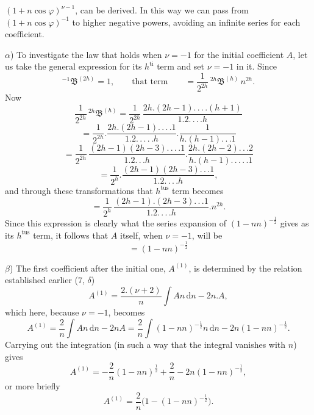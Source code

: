 $(1+n\cos\varphi)^{\nu-1}$, can be derived. In this way we can pass from $(1+n\cos\varphi)^{-1}$ to higher negative powers, avoiding an infinite series for each coefficient.

$\alpha$) To investigate the law that holds when $\nu=-1$ for the initial coefficient $A$, let us take the general expression for its $h^{\text{ti}}$ term and set $\nu=-1$ in it. Since
\[
{}^{-1}\mathfrak{B}^{(2h)} = 1, \qquad \text{that term} \qquad = \frac{1}{2^{2h}}\,{}^{2h}\mathfrak{B}^{(h)}\,n^{2h}.
\]
Now
\[
\frac{1}{2^{2h}}\,{}^{2h}\mathfrak{B}^{(h)} = \frac{1}{2^{2h}}\,\frac{2h.(2h-1).\,.\,.\,.(h+1)}{1.2.\,.\,.\,. h}
\]
\[
= \frac{1}{2^{2h}} . \frac{2h.(2h-1).\,.\,.\,. 1}{1.2.\,.\,.\,.\,. h} . \frac{1}{h.(h-1).\,.\,. 1}
\]
\[
= \frac{1}{2^{2h}}\,\frac{(2h-1)(2h-3).\,.\,.\,. 1}{1.2.\,.\,. h} . \frac{2h.(2h-2).\,.\,. 2}{h.(h-1).\,.\,.\,.\,. 1}
\]
\[
= \frac{1}{2^{h}} . \frac{(2h-1)(2h-3).\,.\,. 1}{1.2.\,.\,.\,. h},
\]
and through these transformations that $h^{\text{tus}}$ term becomes
\[
= \frac{1}{2^{h}}\,\frac{(2h-1).(2h-3).\,.\,. 1}{1.2.\,.\,.\,. h} .  n^{2h}.
\]
Since this expression is clearly what the series expansion of $(1-nn)^{-\frac{1}{2}}$ gives as its $h^{\text{tus}}$ term, it follows that $A$ itself, when $\nu=-1$, will be
\[
= (1-nn)^{-\frac{1}{2}}
\]
\par\noindent\hspace*{\parindent}$\beta$) The first coefficient after the initial one, $A^{(1)}$, is determined by the relation established earlier (7, $\delta$)
\[
A^{(1)} = \frac{2.(\nu+2)}{n}\int An\,\mathrm{d}n - 2n.A,
\]
which here, because $\nu=-1$, becomes
\[
A^{(1)} = \frac{2}{n}\int An\,\mathrm{d}n - 2nA = \frac{2}{n}\int(1-nn)^{-\frac{1}{2}}n\,\mathrm{d}n - 2n(1-nn)^{-\frac{1}{2}}.
\]
Carrying out the integration (in such a way that the integral vanishes with $n$) gives
\[
A^{(1)} = -\frac{2}{n}(1-nn)^{\frac{1}{2}} + \frac{2}{n} - 2n(1-nn)^{-\frac{1}{2}},
\]
or more briefly
\[
A^{(1)} = \frac{2}{n}\bigl(1-(1-nn)^{-\frac{1}{2}}\bigr).
\]

